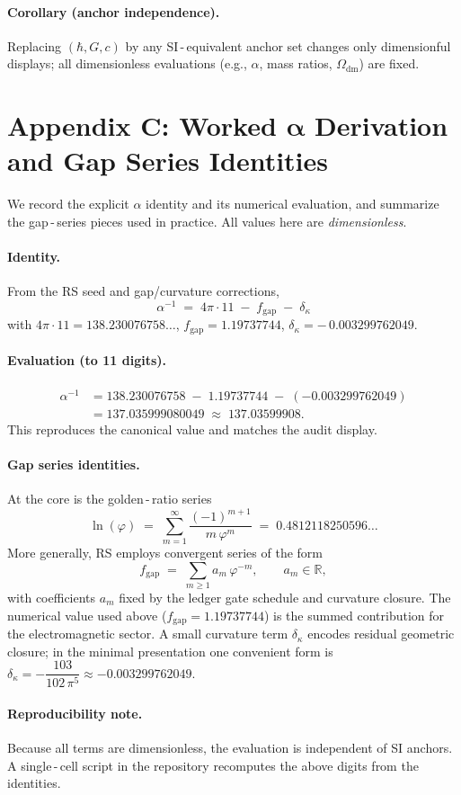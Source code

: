 \documentclass[11pt]{article}
\newcommand{\RR}{\mathbb{R}}
\newcommand{\ph}{\varphi}
\theoremstyle{remark}
\begin{document}
\paragraph{Corollary (anchor independence).}
Replacing $(\hbar,G,c)$ by any SI\,\mbox{-}\,equivalent anchor set changes only dimensionful displays;
all dimensionless evaluations (e.g., $\alpha$, mass ratios, $\Omega_{\mathrm{dm}}$) are fixed.

\bigskip
\section*{Appendix C: Worked $\boldsymbol{\alpha}$ Derivation and Gap Series Identities}
We record the explicit $\alpha$ identity and its numerical evaluation, and summarize the
gap\,\mbox{-}\,series pieces used in practice. All values here are \emph{dimensionless}.

\paragraph{Identity.}
From the RS seed and gap/curvature corrections,
\[
  \boxed{\;\alpha^{-1} \;=\; 4\pi\cdot 11\; -\; f_{\mathrm{gap}}\; -\; \delta_{\kappa}\;}
\]
with
$4\pi\cdot 11 = 138.230076758\ldots$,\; $f_{\mathrm{gap}} = 1.19737744$,\; $\delta_{\kappa} = -\,0.003299762049$.

\paragraph{Evaluation (to 11 digits).}
\[
\begin{aligned}
  \alpha^{-1}
  &= 138.230076758\; -\; 1.19737744\; -\; ( -0.003299762049) \\
  &= 137.035999080049\;\approx\; \mathbf{137.03599908}.
\end{aligned}
\]
This reproduces the canonical value and matches the audit display.

\paragraph{Gap series identities.}
At the core is the golden\,\mbox{-}\,ratio series
\[
  \ln(\ph) \;=\; \sum_{m=1}^{\infty} \frac{(-1)^{m+1}}{m\,\ph^{m}} \;=\; 0.4812118250596\ldots
\]
More generally, RS employs convergent series of the form
\[
  f_{\mathrm{gap}} \;=\; \sum_{m\ge 1} a_m\,\ph^{-m},\qquad a_m\in\RR,
\]
with coefficients $a_m$ fixed by the ledger gate schedule and curvature closure. The
numerical value used above ($f_{\mathrm{gap}}=1.19737744$) is the summed contribution for
the electromagnetic sector. A small curvature term $\delta_{\kappa}$ encodes residual
geometric closure; in the minimal presentation one convenient form is
\(
  \delta_{\kappa} = -\dfrac{103}{102\,\pi^{5}} \approx -0.003299762049.
\)

\paragraph{Reproducibility note.}
Because all terms are dimensionless, the evaluation is independent of SI anchors. A
single\,\mbox{-}\,cell script in the repository recomputes the above digits from the identities.
\end{document}
